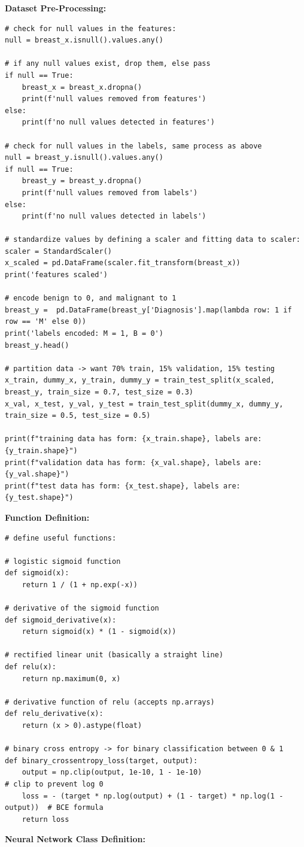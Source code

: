 \documentclass[a4paper]{article}
\begin{document}
\textbf{Dataset Pre-Processing:}
\begin{lstlisting}
# check for null values in the features:
null = breast_x.isnull().values.any()   

# if any null values exist, drop them, else pass
if null == True:
    breast_x = breast_x.dropna() 
    print(f'null values removed from features')
else:
    print(f'no null values detected in features')

# check for null values in the labels, same process as above
null = breast_y.isnull().values.any()
if null == True:
    breast_y = breast_y.dropna()
    print(f'null values removed from labels')
else:
    print(f'no null values detected in labels')
    
# standardize values by defining a scaler and fitting data to scaler:
scaler = StandardScaler()
x_scaled = pd.DataFrame(scaler.fit_transform(breast_x))
print('features scaled')

# encode benign to 0, and malignant to 1
breast_y =  pd.DataFrame(breast_y['Diagnosis'].map(lambda row: 1 if row == 'M' else 0))
print('labels encoded: M = 1, B = 0')
breast_y.head()

# partition data -> want 70% train, 15% validation, 15% testing
x_train, dummy_x, y_train, dummy_y = train_test_split(x_scaled, breast_y, train_size = 0.7, test_size = 0.3)
x_val, x_test, y_val, y_test = train_test_split(dummy_x, dummy_y, train_size = 0.5, test_size = 0.5)

print(f"training data has form: {x_train.shape}, labels are: {y_train.shape}")
print(f"validation data has form: {x_val.shape}, labels are: {y_val.shape}")
print(f"test data has form: {x_test.shape}, labels are: {y_test.shape}")
\end{lstlisting}

\textbf{Function Definition:}
\begin{lstlisting}
# define useful functions:

# logistic sigmoid function
def sigmoid(x):
    return 1 / (1 + np.exp(-x))

# derivative of the sigmoid function
def sigmoid_derivative(x):
    return sigmoid(x) * (1 - sigmoid(x))

# rectified linear unit (basically a straight line)
def relu(x):
    return np.maximum(0, x)

# derivative function of relu (accepts np.arrays)
def relu_derivative(x):
    return (x > 0).astype(float)

# binary cross entropy -> for binary classification between 0 & 1
def binary_crossentropy_loss(target, output):
    output = np.clip(output, 1e-10, 1 - 1e-10)                              # clip to prevent log 0
    loss = - (target * np.log(output) + (1 - target) * np.log(1 - output))  # BCE formula
    return loss    
\end{lstlisting}
\newpage
\textbf{Neural Network Class Definition:}
\end{document}
